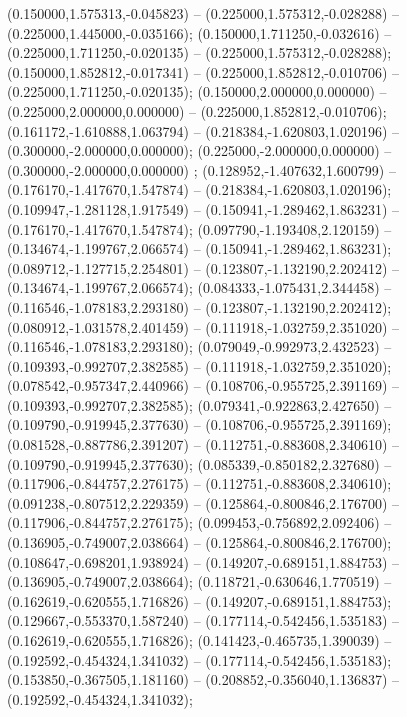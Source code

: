  (0.150000,1.575313,-0.045823) -- (0.225000,1.575312,-0.028288) -- (0.225000,1.445000,-0.035166);
 (0.150000,1.711250,-0.032616) -- (0.225000,1.711250,-0.020135) -- (0.225000,1.575312,-0.028288);
 (0.150000,1.852812,-0.017341) -- (0.225000,1.852812,-0.010706) -- (0.225000,1.711250,-0.020135);
 (0.150000,2.000000,0.000000) -- (0.225000,2.000000,0.000000) -- (0.225000,1.852812,-0.010706);
 (0.161172,-1.610888,1.063794) -- (0.218384,-1.620803,1.020196) -- (0.300000,-2.000000,0.000000);
 (0.225000,-2.000000,0.000000) -- (0.300000,-2.000000,0.000000) ;
 (0.128952,-1.407632,1.600799) -- (0.176170,-1.417670,1.547874) -- (0.218384,-1.620803,1.020196);
 (0.109947,-1.281128,1.917549) -- (0.150941,-1.289462,1.863231) -- (0.176170,-1.417670,1.547874);
 (0.097790,-1.193408,2.120159) -- (0.134674,-1.199767,2.066574) -- (0.150941,-1.289462,1.863231);
 (0.089712,-1.127715,2.254801) -- (0.123807,-1.132190,2.202412) -- (0.134674,-1.199767,2.066574);
 (0.084333,-1.075431,2.344458) -- (0.116546,-1.078183,2.293180) -- (0.123807,-1.132190,2.202412);
 (0.080912,-1.031578,2.401459) -- (0.111918,-1.032759,2.351020) -- (0.116546,-1.078183,2.293180);
 (0.079049,-0.992973,2.432523) -- (0.109393,-0.992707,2.382585) -- (0.111918,-1.032759,2.351020);
 (0.078542,-0.957347,2.440966) -- (0.108706,-0.955725,2.391169) -- (0.109393,-0.992707,2.382585);
 (0.079341,-0.922863,2.427650) -- (0.109790,-0.919945,2.377630) -- (0.108706,-0.955725,2.391169);
 (0.081528,-0.887786,2.391207) -- (0.112751,-0.883608,2.340610) -- (0.109790,-0.919945,2.377630);
 (0.085339,-0.850182,2.327680) -- (0.117906,-0.844757,2.276175) -- (0.112751,-0.883608,2.340610);
 (0.091238,-0.807512,2.229359) -- (0.125864,-0.800846,2.176700) -- (0.117906,-0.844757,2.276175);
 (0.099453,-0.756892,2.092406) -- (0.136905,-0.749007,2.038664) -- (0.125864,-0.800846,2.176700);
 (0.108647,-0.698201,1.938924) -- (0.149207,-0.689151,1.884753) -- (0.136905,-0.749007,2.038664);
 (0.118721,-0.630646,1.770519) -- (0.162619,-0.620555,1.716826) -- (0.149207,-0.689151,1.884753);
 (0.129667,-0.553370,1.587240) -- (0.177114,-0.542456,1.535183) -- (0.162619,-0.620555,1.716826);
 (0.141423,-0.465735,1.390039) -- (0.192592,-0.454324,1.341032) -- (0.177114,-0.542456,1.535183);
 (0.153850,-0.367505,1.181160) -- (0.208852,-0.356040,1.136837) -- (0.192592,-0.454324,1.341032);
